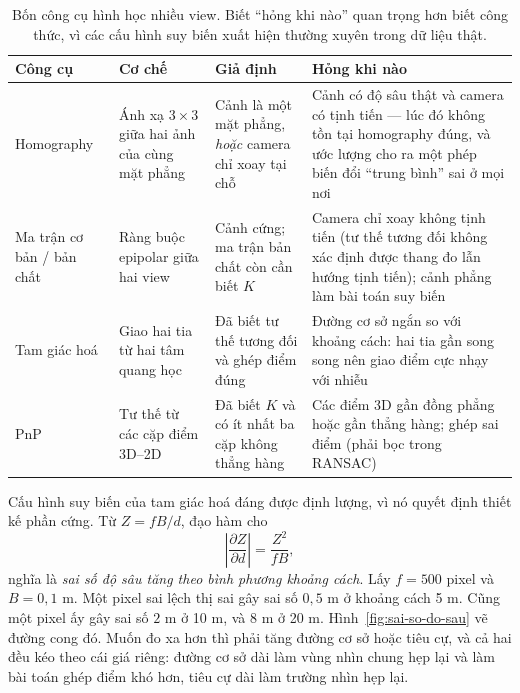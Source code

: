 \documentclass[../../../deep_learning.tex]{subfiles}
\begin{document}
\begin{table}[H]\centering\small
\caption{Bốn công cụ hình học nhiều view. Biết ``hỏng khi nào'' quan trọng hơn biết công thức, vì các cấu hình suy biến xuất hiện thường xuyên trong dữ liệu thật.}
\label{tab:nhieu-view}
\begin{tabularx}{\linewidth}{@{}L{2.1cm}L{3.0cm}YL{4.1cm}@{}}
\toprule
\textbf{Công cụ} & \textbf{Cơ chế} & \textbf{Giả định} & \textbf{Hỏng khi nào}\\
\midrule
Homography & Ánh xạ \(3\times3\) giữa hai ảnh của cùng mặt phẳng & Cảnh là một mặt phẳng, \emph{hoặc} camera chỉ xoay tại chỗ & Cảnh có độ sâu thật và camera có tịnh tiến --- lúc đó không tồn tại homography đúng, và ước lượng cho ra một phép biến đổi ``trung bình'' sai ở mọi nơi\\
Ma trận cơ bản / bản chất & Ràng buộc epipolar giữa hai view & Cảnh cứng; ma trận bản chất còn cần biết \(K\) & Camera chỉ xoay không tịnh tiến (tư thế tương đối không xác định được thang đo lẫn hướng tịnh tiến); cảnh phẳng làm bài toán suy biến\\
Tam giác hoá & Giao hai tia từ hai tâm quang học & Đã biết tư thế tương đối và ghép điểm đúng & Đường cơ sở ngắn so với khoảng cách: hai tia gần song song nên giao điểm cực nhạy với nhiễu\\
PnP & Tư thế từ các cặp điểm 3D--2D & Đã biết \(K\) và có ít nhất ba cặp không thẳng hàng & Các điểm 3D gần đồng phẳng hoặc gần thẳng hàng; ghép sai điểm (phải bọc trong RANSAC)\\
\bottomrule
\end{tabularx}
\end{table}

Cấu hình suy biến của tam giác hoá đáng được định lượng, vì nó quyết định thiết kế phần cứng. Từ \(Z = fB/d\), đạo hàm cho
\[
\left|\frac{\partial Z}{\partial d}\right| = \frac{Z^2}{fB},
\]
nghĩa là \emph{sai số độ sâu tăng theo bình phương khoảng cách}. Lấy \(f=500\) pixel và \(B=0{,}1\) m. Một pixel sai lệch thị sai gây sai số \(0{,}5\) m ở khoảng cách 5 m. Cũng một pixel ấy gây sai số \(2\) m ở 10 m, và \(8\) m ở 20 m. Hình~\ref{fig:sai-so-do-sau} vẽ đường cong đó. Muốn đo xa hơn thì phải tăng đường cơ sở hoặc tiêu cự, và cả hai đều kéo theo cái giá riêng: đường cơ sở dài làm vùng nhìn chung hẹp lại và làm bài toán ghép điểm khó hơn, tiêu cự dài làm trường nhìn hẹp lại.
\end{document}
